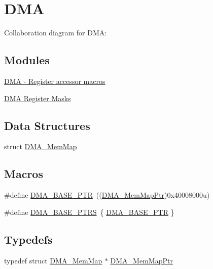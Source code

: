 \hypertarget{group___d_m_a___peripheral}{}\section{D\+MA}
\label{group___d_m_a___peripheral}
Collaboration diagram for D\+MA\+:
\subsection*{Modules}
\begin{DoxyCompactItemize}
\item 
\hyperlink{group___d_m_a___register___accessor___macros}{D\+M\+A -\/ Register accessor macros}
\item 
\hyperlink{group___d_m_a___register___masks}{D\+M\+A Register Masks}
\end{DoxyCompactItemize}
\subsection*{Data Structures}
\begin{DoxyCompactItemize}
\item 
struct \hyperlink{struct_d_m_a___mem_map}{D\+M\+A\+\_\+\+Mem\+Map}
\end{DoxyCompactItemize}
\subsection*{Macros}
\begin{DoxyCompactItemize}
\item 
\#define \hyperlink{group___d_m_a___peripheral_ga6997fbc1b1973e9f27170217a3bd6f22}{D\+M\+A\+\_\+\+B\+A\+S\+E\+\_\+\+P\+TR}~((\hyperlink{group___d_m_a___peripheral_ga160c27c95a39a9791079b32fe7e843a1}{D\+M\+A\+\_\+\+Mem\+Map\+Ptr})0x40008000u)
\item 
\#define \hyperlink{group___d_m_a___peripheral_gada914e90165e25ae4eeddf5175920e77}{D\+M\+A\+\_\+\+B\+A\+S\+E\+\_\+\+P\+T\+RS}~\{ \hyperlink{group___d_m_a___peripheral_ga6997fbc1b1973e9f27170217a3bd6f22}{D\+M\+A\+\_\+\+B\+A\+S\+E\+\_\+\+P\+TR} \}
\end{DoxyCompactItemize}
\subsection*{Typedefs}
\begin{DoxyCompactItemize}
\item 
typedef struct \hyperlink{struct_d_m_a___mem_map}{D\+M\+A\+\_\+\+Mem\+Map} $\ast$ \hyperlink{group___d_m_a___peripheral_ga160c27c95a39a9791079b32fe7e843a1}{D\+M\+A\+\_\+\+Mem\+Map\+Ptr}
\end{DoxyCompactItemize}


